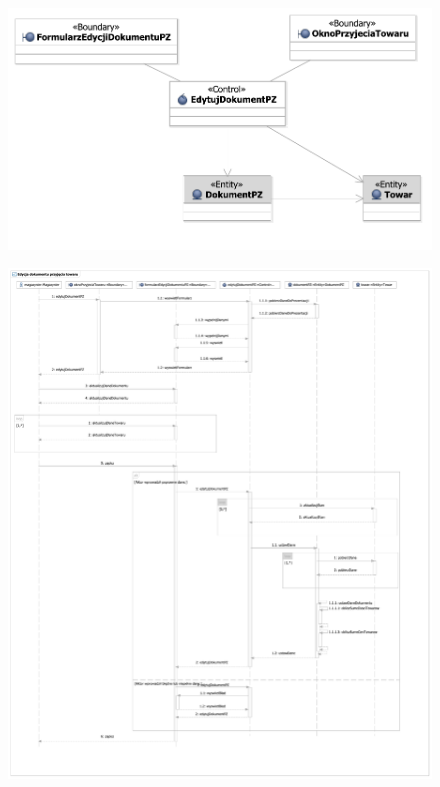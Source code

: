 \begin{figure}[H]
  \centering
  \includegraphics[angle=\ecbangle, scale=\ecbscale]{../img/usecase/pu25ecb.pdf}
  \caption{}
\end{figure}
\newpage
\begin{figure}[H]
  \centering
  \includegraphics[angle=\seqangle, scale=\seqscalemin]{../img/usecase/pu25seq.pdf}
  \caption{}
\end{figure}
\newpage

